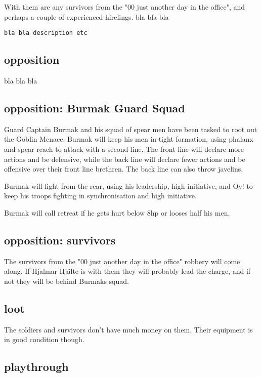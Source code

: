 With them are any survivors from the "00 just another day in the office", and perhaps a couple of experienced hirelings.
bla bla bla

\small \begin{verbatim}
bla bla description etc
\end{verbatim} \normalsize


\subsection*{opposition}

bla bla bla


\subsection*{opposition: Burmak Guard Squad}

Guard Captain Burmak and his squad of spear men have been tasked to root out the Goblin Menace. Burmak will keep his men in tight formation, using phalanx and spear reach to attack with a second line. The front line will declare more actions and be defensive, while the back line will declare fewer actions and be offensive over their front line brethren. The back line can also throw javelins.

Burmak will fight from the rear, using his leadership, high initiative, and Oy! to keep his troops fighting in synchronisation and high initiative.

Burmak will call retreat if he gets hurt below 8hp or looses half his men.


\subsection*{opposition: survivors}

The survivors from the "00 just another day in the office" robbery will come along. If Hjalmar Hjälte is with them they will probably lead the charge, and if not they will be behind Burmaks squad.


\subsection*{loot}

The soldiers and survivors don't have much money on them. Their equipment is in good condition though.


\subsection*{playthrough}

